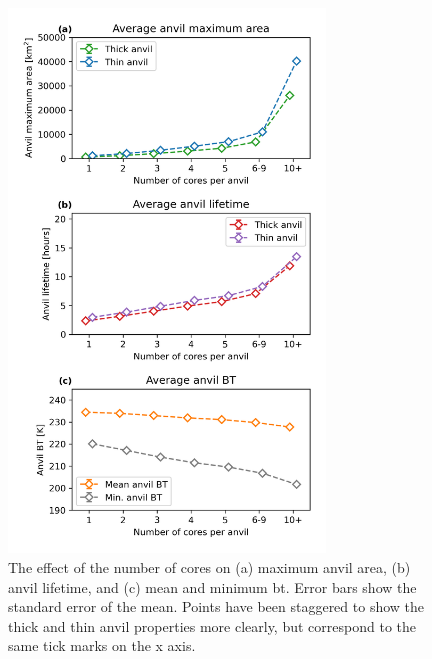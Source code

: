 \begin{figure}[tp]
    \centering
    \includegraphics[width=0.75\textwidth]{figures/chapter3_07.png}
    \caption[
    The effect of the number of cores on maximum anvil area, anvil lifetime, and mean and minimum \acrshort{bt}
    ]{
    The effect of the number of cores on (a) maximum anvil area, (b) anvil lifetime, and (c) mean and minimum \acrshort{bt}. Error bars show the standard error of the mean. Points have been staggered to show the thick and thin anvil properties more clearly, but correspond to the same tick marks on the x axis.
    }
    \label{fig:anvil_number_of_cores_properties}
\end{figure}

